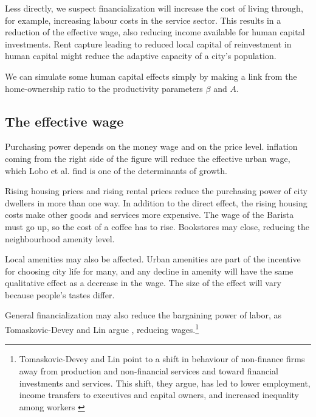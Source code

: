 Less directly, we suspect financialization will increase the cost of living through, for example, increasing labour costs in the service sector. This results in a reduction of the effective wage, also reducing income available for human capital investments. Rent capture leading to reduced local capital of reinvestment in human capital might reduce the adaptive capacity of a city's population.

We can simulate some human capital effects simply by making a link from the home-ownership ratio to the productivity parameters  $\beta$ and $A$. 



\subsection{The effective wage}

Purchasing power depends on the money wage and on the price level. inflation coming from the right side of the figure will reduce the effective urban wage, which Lobo et al. find is one of the determinants of growth. 

 Rising housing prices and rising rental prices reduce the purchasing power of city dwellers in more than one way. In addition to the direct effect, the rising housing costs make other goods and services more expensive. The wage of the Barista must go up, so the cost of a coffee has to rise. Bookstores may close, reducing the neighbourhood amenity level. 
 
 Local amenities may also be affected. Urban amenities  are part of the incentive for choosing city life for many, and any decline in amenity will have the same qualitative effect as a decrease in the wage. The size of the effect will vary because people's tastes differ. 


 General financialization may also reduce the bargaining power of labor, as Tomaskovic-Devey and Lin argue \cite{tomaskovic-deveyFinancializationCausesInequality2013}, reducing wages.\footnote{Tomaskovic-Devey and Lin point to a shift in behaviour of non-finance firms away from production and non-financial services and toward financial investments and services. This shift, they argue,  has led to lower employment, income transfers to executives and capital owners, and increased inequality among workers \cite{tomaskovic-deveyFinancializationCausesInequality2013}}


